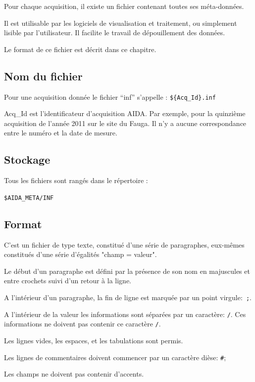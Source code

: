 Pour chaque acquisition, il existe un fichier contenant toutes
ses méta-données.

Il est utilisable par les logiciels de visualisation et traitement,
ou simplement lisible par l'utilisateur. Il facilite le travail
de dépouillement des données.

Le format de ce fichier est décrit dans ce chapitre.

\subsection{Nom du fichier}

Pour une acquisition donnée le fichier ``inf'' s'appelle :
\texttt{\$\{Acq\_Id\}.inf}

 Acq\_Id est l'identificateur d'acquisition AIDA. Par exemple,
 pour la quinzième acquisition de l'année 2011
sur le site du Fauga.
    Il n'y a aucune correspondance entre le numéro et la date de mesure.


\subsection{Stockage}

Tous les fichiers sont rangés dans le répertoire : 

\texttt{\$AIDA\_META\//INF}


\subsection{Format}

C'est un fichier de type texte, constitué d'une série de paragraphes,
eux-mêmes constitués d'une série d'égalités "champ = valeur". 

Le début d'un paragraphe est défini par la présence de son
nom en majuscules et entre crochets suivi d'un retour à la ligne.

A l'intérieur d'un paragraphe, la fin de ligne est marquée
par un point virgule:~\texttt{;}.

A l'intérieur de la valeur les informations sont séparées par un caractère:
\texttt{/}. Ces informations ne doivent pas contenir ce caractère \texttt{/}.

Les lignes vides, les espaces, et les tabulations sont permis.

Les lignes de commentaires doivent commencer par un caractère
dièse: \texttt{\#};

Les champs ne doivent pas contenir d'accents.

